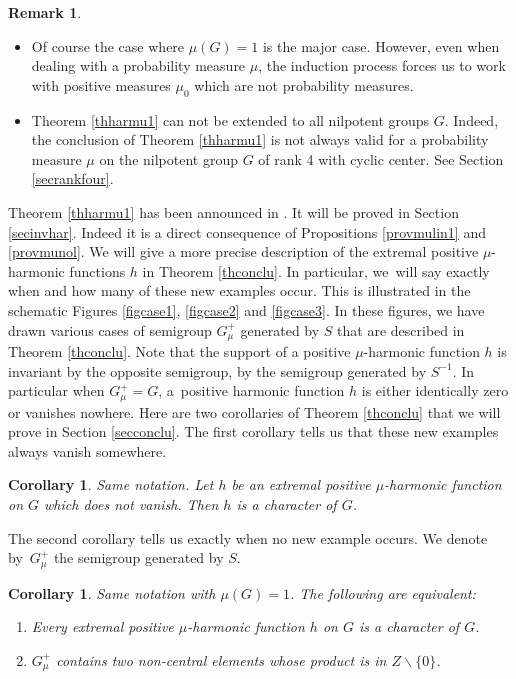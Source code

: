 \documentclass[JEP,XML,SOM,Unicode]{cedram}
\newenvironment{enumeratei}
{\bgroup\def\theenumi{\roman{enumi}}\def\theenumii{\arabic{enumii}}\begin{enumerate}}
{\end{enumerate}\egroup}
\newtheorem{Cor}[Thm]{Corollary}
\theoremstyle{definition}
\newtheorem{Rem}[Thm]{Remark}
\begin{document}
\skpt
\begin{Rem}
\begin{itemize}
\item
Of course the case where $\mu(G)=1$
is the major case.
However, even when dealing with a probability measure $\mu$,
the induction process forces us to work with positive measures
$\mu_0$ which are not probability measures.

\item
Theorem \ref{thharmu1} can not be extended to all
nilpotent groups $G$. Indeed, the conclusion of Theorem
\ref{thharmu1} is not always valid for
a probability measure $\mu$ on the
nilpotent group $G$ of rank 4 with cyclic center.
See Section \ref{secrankfour}.
\end{itemize}
\end{Rem}

Theorem \ref{thharmu1} has been announced in
\cite{BenoistHeisenberg1}.
It will be proved in Section \ref{secinvhar}. Indeed it is a
direct consequence of Propositions \ref{provmulin1} and \ref{provmunol}.
We will give a more precise description of the
extremal positive $\mu$-harmonic functions $h$
in Theorem \ref{thconclu}.
In particular, we~will say exactly when and how many of these new examples occur. This is illustrated in the schematic Figures
\ref{figcase1}, \ref{figcase2} and \ref{figcase3}. In these figures, we have drawn
various cases of semigroup $G_\mu^+$ generated by $S$
that are described in Theorem \ref{thconclu}.
Note that the support of a positive $\mu$-harmonic function $h$ is invariant by the opposite semigroup, \ie by the semigroup generated by $S^{-1}$.
In particular when $G_\mu^+=G$, a~positive harmonic function $h$ is either
identically zero or vanishes nowhere.
Here are two corollaries of Theorem \ref{thconclu} that we will prove in Section \ref{secconclu}.
The first corollary tells us that these new examples always
vanish somewhere.\enlargethispage{.5\baselineskip}%

\begin{Cor}
\label{corharmu1}
Same notation.
Let $h$ be an extremal positive $\mu$-harmonic function
on $G$ which does not vanish. Then $h$ is a character of $G$.
\end{Cor}

The second corollary tells us exactly when no new example occurs.
We denote by~$G_\mu^+$ the semigroup generated by $S$.

\begin{Cor}
\label{corharmu2}
Same notation with $\mu(G)=1$.
The following are equivalent:
\begin{enumeratei}
\item\label{corharmu2i}
Every extremal positive $\mu$-harmonic function $h$ on $G$ is
a character of $G$.
\item\label{corharmu2ii}
$G_\mu^+$ contains two non-central elements whose product is in
$Z\smallsetminus \{0\}$.
\end{enumeratei}
\end{Cor}
\end{document}
